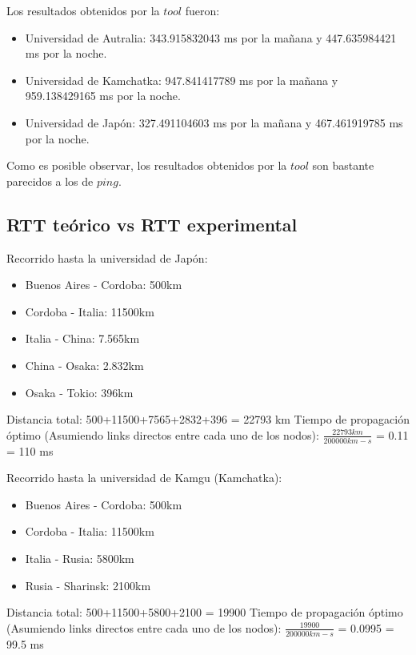 Los resultados obtenidos por la $tool$ fueron:

\begin{itemize}
	\item Universidad de Autralia: 343.915832043 ms por la mañana y 447.635984421 ms por la noche.
	\item Universidad de Kamchatka: 947.841417789 ms por la mañana y 959.138429165 ms por la noche.
	\item Universidad de Japón: 327.491104603 ms por la mañana y 467.461919785 ms por la noche.
\end{itemize}

Como es posible observar, los resultados obtenidos por la $tool$ son bastante parecidos a los de $ping$.

\subsection{RTT teórico vs RTT experimental}

Recorrido hasta la universidad de Japón:

\begin{itemize}
	\item Buenos Aires - Cordoba: 500km
	\item Cordoba - Italia: 11500km
	\item Italia - China: 7.565km
	\item China - Osaka: 2.832km
	\item Osaka - Tokio: 396km
\end{itemize}

Distancia total: 500+11500+7565+2832+396 = 22793 km
Tiempo de propagación óptimo (Asumiendo links directos entre cada uno de los nodos):
$\frac{22793km}{200000km-s}$ = 0.11 = 110 ms


Recorrido hasta la universidad de Kamgu (Kamchatka):

\begin{itemize}
	\item Buenos Aires - Cordoba: 500km
	\item Cordoba - Italia: 11500km
	\item Italia - Rusia: 5800km
	\item Rusia - Sharinsk:  2100km
\end{itemize}

Distancia total: 500+11500+5800+2100 = 19900
Tiempo de propagación óptimo (Asumiendo links directos entre cada uno de los nodos):
$\frac{19900}{200000km-s}$ = 0.0995 = 99.5 ms

